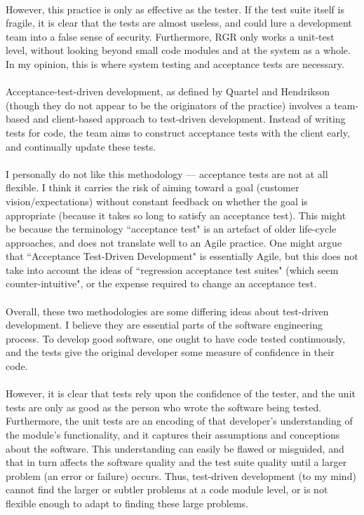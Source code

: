 \\
However, this practice is only as effective as the tester.
If the test suite itself is fragile, it is clear that the tests are almost useless, and could lure a
development team into a false sense of security.
Furthermore, RGR only works a unit-test level, without looking beyond small code modules and at the
system as a whole.
In my opinion, this is where system testing and acceptance tests are necessary.\\
\\
Acceptance-test-driven development, as defined by Quartel \cite{AcceptQuartel} and Hendrikson
\cite{AcceptHendr} (though they do not appear to be
the originators of the practice) involves a team-based and client-based approach to test-driven
development.
Instead of writing tests for code, the team aims to construct acceptance tests with the client
early, and continually update these tests.\\
\\
I personally do not like this methodology --- acceptance tests are not at all flexible. 
I think it carries the risk of aiming toward a goal (customer vision/expectations) without constant
feedback on whether the goal is appropriate (because it takes so long to satisfy an acceptance test).
This might be because the terminology ``acceptance test" is an artefact of older life-cycle
approaches, and does not translate well to an Agile practice.
One might argue that ``Acceptance Test-Driven Development" is essentially Agile, but this does not
take into account the ideas of ``regression acceptance test suites" (which seem counter-intuitive",
or the expense required to change an acceptance test.\\
\\
Overall, these two methodologies are some differing ideas about test-driven development.
I believe they are essential parts of the software engineering process.
To develop good software, one ought to have code tested continuously, and the tests give the
original developer some measure of confidence in their code.\\
\\
However, it is clear that tests rely upon the confidence of the tester, and the unit tests are only
as good as the person who wrote the software being tested.
Furthermore, the unit tests are an encoding of that developer's understanding of the module's
functionality, and it captures their assumptions and conceptions about the software.
This understanding can easily be flawed or misguided, and that in turn affects the software quality
and the test suite quality until a larger problem (an error or failure) occurs.
Thus, test-driven development (to my mind) cannot find the larger or subtler problems at a code module level, or is not flexible enough to adapt to
finding these large problems.

